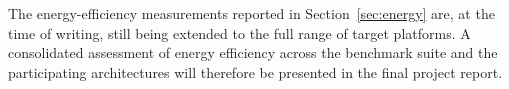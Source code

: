 \documentclass[a4paper,12pt]{article}
\begin{document}
The energy-efficiency measurements reported in Section~\ref{sec:energy} are, at the time of writing, still being extended to the full range of target platforms.
A consolidated assessment of energy efficiency across the benchmark suite and the participating architectures will therefore be presented in the final project report.

\clearpage




\label{MyLastPage}
\end{document}
